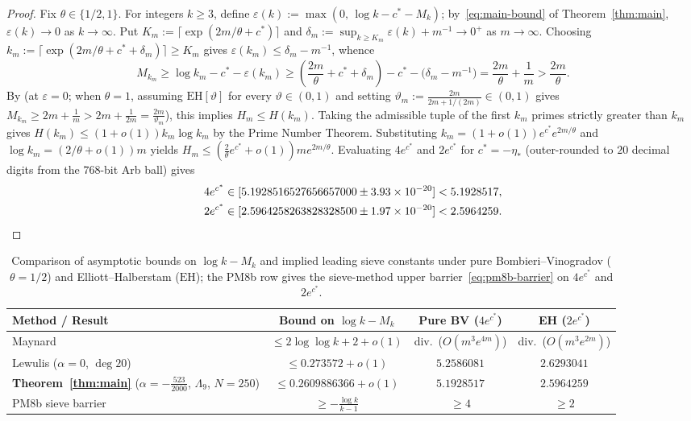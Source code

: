 \documentclass[11pt, reqno]{amsart}
\theoremstyle{remark}
\numberwithin{equation}{section}
\begin{document}
\begin{proof}
Fix $\theta \in \{1/2, 1\}$. For integers $k \ge 3$, define
$\varepsilon(k) := \max(0,\, \log k - c^* - M_k)$; by~\eqref{eq:main-bound} of Theorem~\ref{thm:main},
$\varepsilon(k) \to 0$ as $k \to \infty$. Put $K_m := \lceil \exp(2m/\theta + c^*) \rceil$
and $\delta_m := \sup_{k \ge K_m} \varepsilon(k) + m^{-1} \to 0^+$ as $m \to \infty$.
Choosing $k_m := \lceil \exp(2m/\theta + c^* + \delta_m) \rceil \ge K_m$ gives
$\varepsilon(k_m) \le \delta_m - m^{-1}$, whence
\[
M_{k_m} \ge \log k_m - c^* - \varepsilon(k_m)
\ge \left(\frac{2m}{\theta} + c^* + \delta_m\right) - c^* - \bigl(\delta_m - m^{-1}\bigr)
= \frac{2m}{\theta} + \frac{1}{m} > \frac{2m}{\theta}.
\]
By \cite[Theorems~22 and~26]{PM8b} (at $\varepsilon = 0$; when $\theta = 1$, assuming
$\mathrm{EH}[\vartheta]$ for every $\vartheta \in (0, 1)$ and setting
$\vartheta_m := \frac{2m}{2m + 1/(2m)} \in (0,1)$ gives
$M_{k_m} \ge 2m + \frac{1}{m} > 2m + \frac{1}{2m} = \frac{2m}{\vartheta_m}$), this implies
$H_m \le H(k_m)$. Taking the admissible tuple of the first $k_m$ primes strictly greater than
$k_m$ gives $H(k_m) \le (1+o(1)) k_m \log k_m$ by the Prime Number Theorem. Substituting
$k_m = (1+o(1)) e^{c^*} e^{2m/\theta}$ and $\log k_m = (2/\theta + o(1)) m$ yields
$H_m \le (\frac{2}{\theta} e^{c^*} + o(1)) m e^{2m/\theta}$. Evaluating $4 e^{c^*}$ and
$2 e^{c^*}$ for $c^* = -\eta_*$ (outer-rounded to $20$ decimal digits from the $768$-bit Arb ball)
gives
\begin{align*}
4 e^{c^*} &\in [5.1928516527656657000 \pm 3.93\times 10^{-20}] < 5.1928517, \\
2 e^{c^*} &\in [2.5964258263828328500 \pm 1.97\times 10^{-20}] < 2.5964259. \qedhere
\end{align*}
\end{proof}

\begin{table}[ht]
\centering
\caption{Comparison of asymptotic bounds on $\log k - M_k$ and implied
leading sieve constants under pure Bombieri--Vinogradov ($\theta = 1/2$) and Elliott--Halberstam
($\mathrm{EH}$); the PM8b row gives the sieve-method upper barrier~\eqref{eq:pm8b-barrier} on $4e^{c^*}$ and $2e^{c^*}$.}\label{tab:summary}
\small
\setlength{\tabcolsep}{4pt}
\begin{tabular}{@{}lccc@{}}
\toprule
Method / Result & Bound on $\log k - M_k$ & Pure BV ($4e^{c^*}$) & EH ($2e^{c^*}$) \\
\midrule
Maynard \cite{Maynard} & $\le 2\log\log k + 2 + o(1)$ & div.\ ($O(m^3 e^{4m})$) & div.\ ($O(m^3 e^{2m})$) \\
Lewulis \cite{Lewulis} ($\alpha = 0$, $\deg 20$) & $\le 0.273572 + o(1)$ & $5.2586081$ & $2.6293041$ \\
\textbf{Theorem~\ref{thm:main}} ($\alpha = -\tfrac{523}{2000}$, $\Lambda_9$, $N = 250$) & $\mathbf{\le 0.2609886366} + o(1)$ & $\mathbf{5.1928517}$ & $\mathbf{2.5964259}$ \\
\midrule
PM8b sieve barrier \cite{PM8b} & $\ge -\tfrac{\log k}{k-1}$ & $\ge 4$ & $\ge 2$ \\
\bottomrule
\end{tabular}
\end{table}
\end{document}
